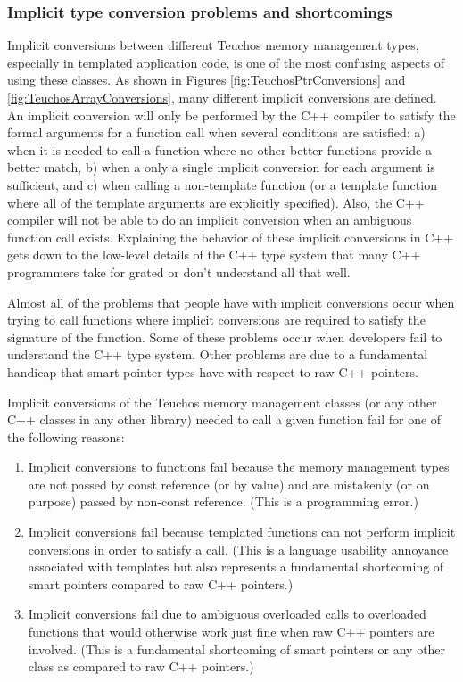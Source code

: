 \documentclass[pdf,ps2pdf,11pt]{SANDreport}
\begin{document}
%
{}\subsubsection{Implicit type conversion problems and shortcomings}
\label{sec:conversion-problems}
%

Implicit conversions between different Teuchos memory management
types, especially in templated application code, is one of the most
confusing aspects of using these classes.  As shown in Figures
{}\ref{fig:TeuchosPtrConversions} and
{}\ref{fig:TeuchosArrayConversions}, many different implicit
conversions are defined.  An implicit conversion will only be
performed by the C++ compiler to satisfy the formal arguments for a
function call when several conditions are satisfied: a) when it is
needed to call a function where no other better functions provide a
better match, b) when a only a single implicit conversion for each
argument is sufficient, and c) when calling a non-template function
(or a template function where all of the template arguments are
explicitly specified).  Also, the C++ compiler will not be able to do
an implicit conversion when an ambiguous function call exists.
Explaining the behavior of these implicit conversions in C++ gets down
to the low-level details of the C++ type system that many C++
programmers take for grated or don't understand all that well.

Almost all of the problems that people have with implicit conversions
occur when trying to call functions where implicit conversions are
required to satisfy the signature of the function.  Some of these
problems occur when developers fail to understand the C++ type system.
Other problems are due to a fundamental handicap that smart pointer
types have with respect to raw C++ pointers.

Implicit conversions of the Teuchos memory management classes (or any
other C++ classes in any other library) needed to call a given
function fail for one of the following reasons:

\begin{enumerate}

{}\item{}Implicit conversions to functions fail because the memory
management types are not passed by const reference (or by value) and
are mistakenly (or on purpose) passed by non-const reference. (This is
a programming error.)

{}\item{}Implicit conversions fail because templated functions can not
perform implicit conversions in order to satisfy a call. (This is a
language usability annoyance associated with templates but also
represents a fundamental shortcoming of smart pointers compared to raw
C++ pointers.)

{}\item{}Implicit conversions fail due to ambiguous overloaded calls
to overloaded functions that would otherwise work just fine when raw
C++ pointers are involved. (This is a fundamental shortcoming of smart
pointers or any other class as compared to raw C++ pointers.)

\end{enumerate}
\end{document}
